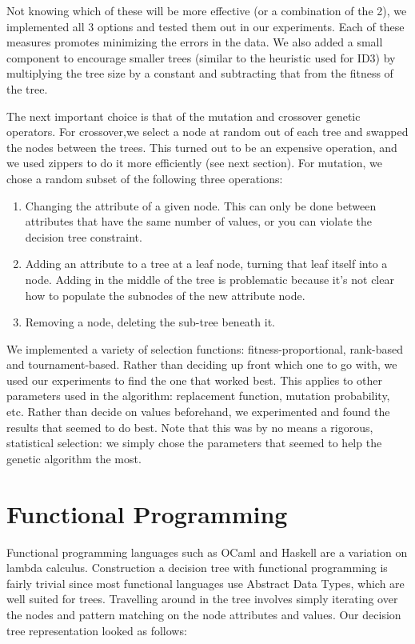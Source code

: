 \documentclass[12pt, letterpaper]{article}
\begin{document}
Not knowing which of these will be more effective (or a combination of the 2), we implemented all 3 options and tested them out in our experiments. Each of these measures promotes minimizing the errors in the data. We also added a small component to encourage smaller trees (similar to the heuristic used for ID3) by multiplying the tree size by a constant and subtracting that from the fitness of the tree.

The next important choice is that of the mutation and crossover genetic operators. For crossover,we select a node at random out of each tree and swapped the nodes between the trees. This turned out to be an expensive operation, and we used zippers to do it more efficiently (see next section). For mutation, we chose a random subset of the following three operations: 

\begin{enumerate}
    \item Changing the attribute of a given node. This can only be done between attributes that have the same number of values, or you can violate the decision tree constraint.
    \item Adding an attribute to a tree at a leaf node, turning that leaf itself into a node. Adding in the middle of the tree is problematic because it's not clear how to populate the subnodes of the new attribute node.
    \item Removing a node, deleting the sub-tree beneath it.
\end{enumerate}

We implemented a variety of selection functions: fitness-proportional, rank-based and tournament-based. Rather than deciding up front which one to go with, we used our experiments to find the one that worked best. This applies to other parameters used in the algorithm: replacement function, mutation probability, etc. Rather than decide on values beforehand, we experimented and found the results that seemed to do best. Note that this was by no means a rigorous, statistical selection: we simply chose the parameters that seemed to help the genetic algorithm the most.

\section{Functional Programming}
Functional programming languages such as OCaml and Haskell are a variation on lambda calculus. Construction a decision tree with functional programming is fairly trivial since most functional languages use Abstract Data Types, which are well suited for trees. Travelling around in the tree involves simply iterating over the nodes and pattern matching on the node attributes and values. Our decision tree representation looked as follows:
\end{document}
